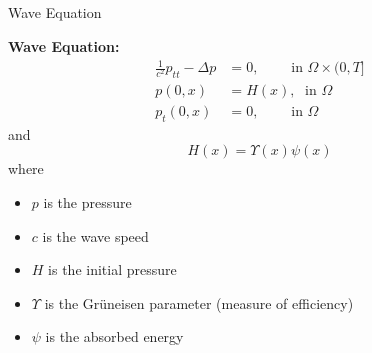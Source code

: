 \documentclass[9pt]{beamer}
\begin{document}
\subsection{}
\begin{frame}{Wave Equation}

\textbf{Wave Equation:}
\begin{align*}
\frac{1}{c^2} p_{tt} - \Delta p &= 0,\;\;\;\;\;\;\;\text{ in } \Omega \times (0, T] \\
p(0,x) & = H(x),\;\text{ in } \Omega  \\
p_t(0,x) &= 0, \;\;\;\;\;\;\;\text{ in } \Omega 
\end{align*}
and 
\[
H(x) = \Upsilon(x) \psi(x)
\]
where 
\begin{itemize}
\item $p$ is the pressure
\item $c$ is the wave speed
\item $H$ is the initial pressure
\item $\Upsilon$ is the Gr\"{u}neisen parameter (measure of efficiency)
\item $\psi$ is the absorbed energy
\end{itemize}

\end{frame}


\end{document}
